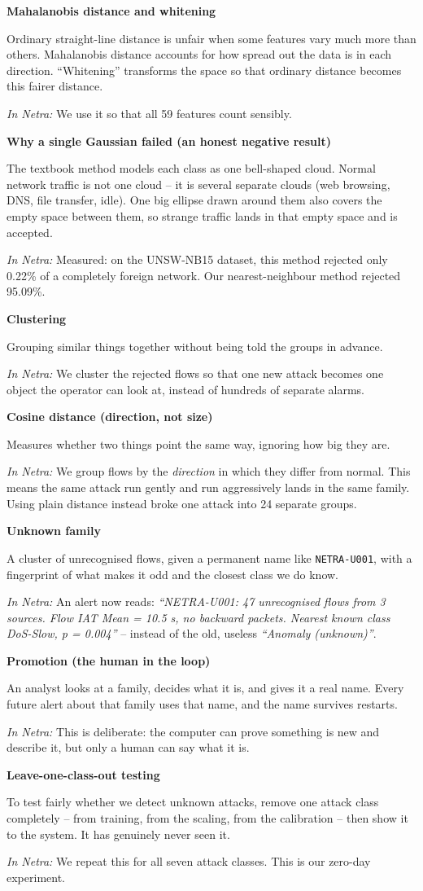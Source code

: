 \documentclass[11pt,a4paper]{article}
\newcommand{\term}[3]{%
  \par\medskip\noindent\textbf{\color{ink}#1}\par
  \nobreak\vspace{1pt}#2\par
  \nobreak\vspace{1pt}\textit{\color{accent}In Netra:} #3\par}
\begin{document}
\term{Mahalanobis distance and whitening}
{Ordinary straight-line distance is unfair when some features vary much more than
others. Mahalanobis distance accounts for how spread out the data is in each
direction. ``Whitening'' transforms the space so that ordinary distance becomes
this fairer distance.}
{We use it so that all 59 features count sensibly.}

\term{Why a single Gaussian failed (an honest negative result)}
{The textbook method models each class as one bell-shaped cloud. Normal network
traffic is not one cloud -- it is several separate clouds (web browsing, DNS, file
transfer, idle). One big ellipse drawn around them also covers the empty space
between them, so strange traffic lands in that empty space and is accepted.}
{Measured: on the UNSW-NB15 dataset, this method rejected only 0.22\% of a
completely foreign network. Our nearest-neighbour method rejected 95.09\%.}

\term{Clustering}
{Grouping similar things together without being told the groups in advance.}
{We cluster the rejected flows so that one new attack becomes one object the
operator can look at, instead of hundreds of separate alarms.}

\term{Cosine distance (direction, not size)}
{Measures whether two things point the same way, ignoring how big they are.}
{We group flows by the \emph{direction} in which they differ from normal. This
means the same attack run gently and run aggressively lands in the same family.
Using plain distance instead broke one attack into 24 separate groups.}

\term{Unknown family}
{A cluster of unrecognised flows, given a permanent name like
\texttt{NETRA-U001}, with a fingerprint of what makes it odd and the closest class
we do know.}
{An alert now reads: \emph{``NETRA-U001: 47 unrecognised flows from 3 sources.
Flow IAT Mean = 10.5 s, no backward packets. Nearest known class DoS-Slow,
p = 0.004''} -- instead of the old, useless \emph{``Anomaly (unknown)''}.}

\term{Promotion (the human in the loop)}
{An analyst looks at a family, decides what it is, and gives it a real name. Every
future alert about that family uses that name, and the name survives restarts.}
{This is deliberate: the computer can prove something is new and describe it, but
only a human can say what it is.}

\term{Leave-one-class-out testing}
{To test fairly whether we detect unknown attacks, remove one attack class
completely -- from training, from the scaling, from the calibration -- then show it
to the system. It has genuinely never seen it.}
{We repeat this for all seven attack classes. This is our zero-day experiment.}
\end{document}
